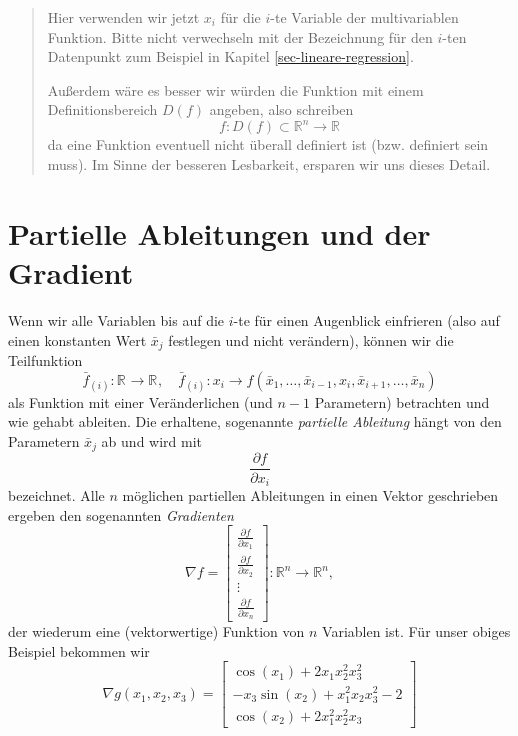 \documentclass[]{book}
\newenvironment {JHSAYS} [0] {\begin{quote}\color{jhsc}} {\end{quote}}
\theoremstyle{definition}
\theoremstyle{definition}
\theoremstyle{definition}
\theoremstyle{definition}
\theoremstyle{remark}
\begin{document}
\leavevmode\hypertarget{variablen-namen}{}%
\begin{JHSAYS}
Hier verwenden wir jetzt \(x_i\) für die \(i\)-te Variable der multivariablen Funktion. Bitte nicht verwechseln mit der Bezeichnung für den \(i\)-ten Datenpunkt zum Beispiel in Kapitel \ref{sec-lineare-regression}.

Außerdem wäre es besser wir würden die Funktion mit einem Definitionsbereich \(D(f)\) angeben, also schreiben
\begin{equation*}
f\colon D(f) \subset \mathbb R^{n}\to \mathbb R^{}
\end{equation*}
da eine Funktion eventuell nicht überall definiert ist (bzw. definiert sein muss). Im Sinne der besseren Lesbarkeit, ersparen wir uns dieses Detail.

\end{JHSAYS}

\hypertarget{partielle-ableitungen-und-der-gradient}{%
\section{Partielle Ableitungen und der Gradient}\label{partielle-ableitungen-und-der-gradient}}

Wenn wir alle Variablen bis auf die \(i\)-te für einen Augenblick einfrieren (also auf einen konstanten Wert \(\bar x_j\) festlegen und nicht verändern), können wir die Teilfunktion
\begin{equation*}
\bar f_{(i)}\colon \mathbb R^{}\to \mathbb R^{}, \quad \bar f_{(i)}\colon x_i \to f(\bar x_1, \dotsc, \bar x_{i-1}, x_i, \bar x_{i+1}, \dotsc, \bar x_n)
\end{equation*}
als Funktion mit einer Veränderlichen (und \(n-1\) Parametern) betrachten und wie gehabt ableiten. Die erhaltene, sogenannte \emph{partielle Ableitung} hängt von den Parametern \(\bar x_j\) ab und wird mit
\begin{equation*}
\frac{\partial f}{\partial x_i}
\end{equation*}
bezeichnet. Alle \(n\) möglichen partiellen Ableitungen in einen Vektor geschrieben ergeben den sogenannten \emph{Gradienten}
\begin{equation*}
\nabla f = 
\begin{bmatrix}
\frac{\partial f}{\partial x_1} \\
\frac{\partial f}{\partial x_2} \\
\vdots \\
\frac{\partial f}{\partial x_n}
\end{bmatrix}
\colon \mathbb R^{n} \to \mathbb R^{n},
\end{equation*}
der wiederum eine (vektorwertige) Funktion von \(n\) Variablen ist.
Für unser obiges Beispiel bekommen wir
\begin{equation*}
\nabla g(x_1, x_2, x_3) =
\begin{bmatrix}
\cos(x_1)+2x_1x_2^2x_3^2\\
-x_3\sin(x_2) + x_1^2x_2x_3^2 - 2 \\
\cos(x_2) + 2x_1^2x_2^2x_3
\end{bmatrix}
\end{equation*}
\end{document}
